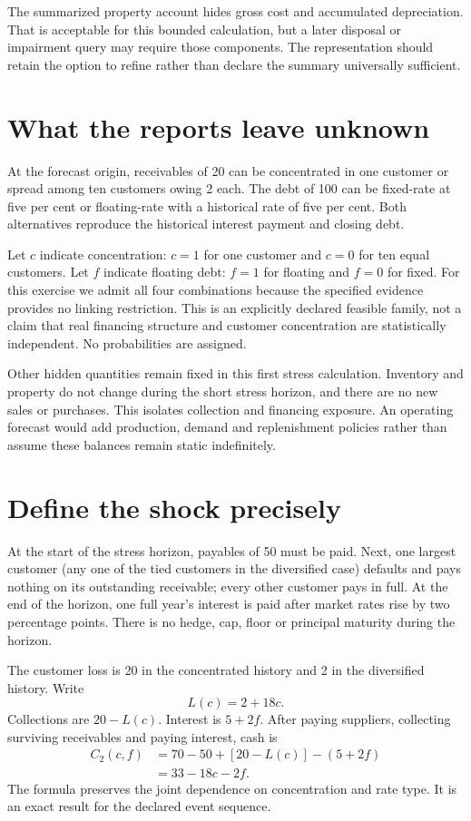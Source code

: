 The summarized property account hides gross cost and accumulated depreciation. That is acceptable for this bounded calculation, but a later disposal or impairment query may require those components. The representation should retain the option to refine rather than declare the summary universally sufficient.

\section{What the reports leave unknown}
At the forecast origin, receivables of 20 can be concentrated in one customer or spread among ten customers owing 2 each. The debt of 100 can be fixed-rate at five per cent or floating-rate with a historical rate of five per cent. Both alternatives reproduce the historical interest payment and closing debt.

Let $c$ indicate concentration: $c=1$ for one customer and $c=0$ for ten equal customers. Let $f$ indicate floating debt: $f=1$ for floating and $f=0$ for fixed. For this exercise we admit all four combinations because the specified evidence provides no linking restriction. This is an explicitly declared feasible family, not a claim that real financing structure and customer concentration are statistically independent. No probabilities are assigned.

Other hidden quantities remain fixed in this first stress calculation. Inventory and property do not change during the short stress horizon, and there are no new sales or purchases. This isolates collection and financing exposure. An operating forecast would add production, demand and replenishment policies rather than assume these balances remain static indefinitely.

\section{Define the shock precisely}
At the start of the stress horizon, payables of 50 must be paid. Next, one largest customer (any one of the tied customers in the diversified case) defaults and pays nothing on its outstanding receivable; every other customer pays in full. At the end of the horizon, one full year's interest is paid after market rates rise by two percentage points. There is no hedge, cap, floor or principal maturity during the horizon.

The customer loss is 20 in the concentrated history and 2 in the diversified history. Write
\begin{equation}
 L(c)=2+18c.
\end{equation}
Collections are $20-L(c)$. Interest is $5+2f$. After paying suppliers, collecting surviving receivables and paying interest, cash is
\begin{align}
 C_2(c,f)&=70-50+[20-L(c)]-(5+2f)\\
 &=33-18c-2f.
 \label{sim:company-stress-cash}
\end{align}
The formula preserves the joint dependence on concentration and rate type. It is an exact result for the declared event sequence.

